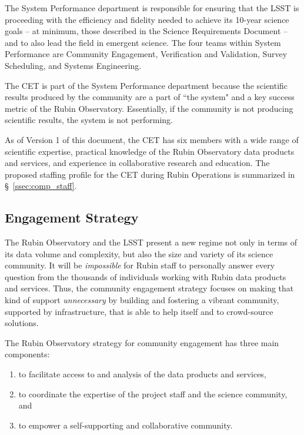 \documentclass[DM,lsstdraft,toc]{lsstdoc}
\begin{document}
The System Performance department is responsible for ensuring that the LSST is proceeding with the efficiency and fidelity needed to achieve its 10-year science goals -- at minimum, those described in the Science Requirements Document  -- and to also lead the field in emergent science.
The four teams within System Performance are Community Engagement, Verification and Validation, Survey Scheduling, and Systems Engineering.

The CET is part of the System Performance department because the scientific results produced by the community are a part of ``the system" and a key success metric of the Rubin Observatory.
Essentially, if the community is not producing scientific results, the system is not performing. 

As of Version 1 of this document, the CET has six members with a wide range of scientific expertise, practical knowledge of the Rubin Observatory data products and services, and experience in collaborative research and education.
The proposed staffing profile for the CET during Rubin Operations is summarized in \S~\ref{ssec:comp_staff}.


\subsection{Engagement Strategy}\label{ssec:intro_strat}

The Rubin Observatory and the LSST present a new regime not only in terms of its data volume and complexity, but also the size and variety of its science community.
It will be \textit{impossible} for Rubin staff to personally answer every question from the thousands of individuals working with Rubin data products and services.
Thus, the community engagement strategy focuses on making that kind of support \textit{unnecessary} by building and fostering a vibrant community, supported by infrastructure, that is able to help itself and to crowd-source solutions. 

The Rubin Observatory strategy for community engagement has three main components:
\begin{enumerate}
\item to facilitate access to and analysis of the data products and services,
\item to coordinate the expertise of the project staff and the science community, and
\item to empower a self-supporting and collaborative community.
\end{enumerate}
\end{document}
